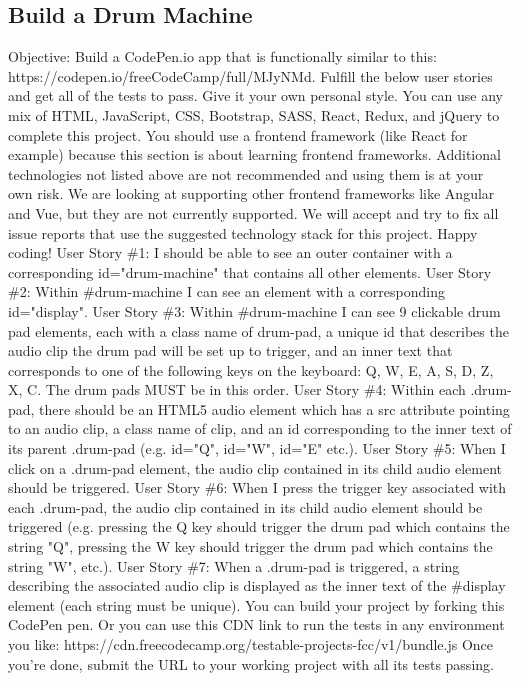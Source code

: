 \documentclass{article}%
\begin{document}
%
\subsection{Build a Drum Machine}%
\label{subsec:BuildaDrumMachine}%
Objective: Build a CodePen.io app that is functionally similar to this: https://codepen.io/freeCodeCamp/full/MJyNMd.\newline%
Fulfill the below user stories and get all of the tests to pass. Give it your own personal style.\newline%
You can use any mix of HTML, JavaScript, CSS, Bootstrap, SASS, React, Redux, and jQuery to complete this project. You should use a frontend framework (like React for example) because this section is about learning frontend frameworks. Additional technologies not listed above are not recommended and using them is at your own risk. We are looking at supporting other frontend frameworks like Angular and Vue, but they are not currently supported. We will accept and try to fix all issue reports that use the suggested technology stack for this project. Happy coding!\newline%
User Story \#1: I should be able to see an outer container with a corresponding id="drum{-}machine" that contains all other elements.\newline%
User Story \#2: Within \#drum{-}machine I can see an element with a corresponding id="display".\newline%
User Story \#3: Within \#drum{-}machine I can see 9 clickable drum pad elements, each with a class name of drum{-}pad, a unique id that describes the audio clip the drum pad will be set up to trigger, and an inner text that corresponds to one of the following keys on the keyboard: Q, W, E, A, S, D, Z, X, C. The drum pads MUST be in this order.\newline%
User Story \#4: Within each .drum{-}pad, there should be an HTML5 audio element which has a src attribute pointing to an audio clip, a class name of clip, and an id corresponding to the inner text of its parent .drum{-}pad (e.g. id="Q", id="W", id="E" etc.).\newline%
User Story \#5: When I click on a .drum{-}pad element, the audio clip contained in its child audio element should be triggered.\newline%
User Story \#6: When I press the trigger key associated with each .drum{-}pad, the audio clip contained in its child audio element should be triggered (e.g. pressing the Q key should trigger the drum pad which contains the string "Q", pressing the W key should trigger the drum pad which contains the string "W", etc.).\newline%
User Story \#7: When a .drum{-}pad is triggered, a string describing the associated audio clip is displayed as the inner text of the \#display element (each string must be unique).\newline%
You can build your project by forking this CodePen pen. Or you can use this CDN link to run the tests in any environment you like: https://cdn.freecodecamp.org/testable{-}projects{-}fcc/v1/bundle.js\newline%
Once you're done, submit the URL to your working project with all its tests passing.\newline%
\end{document}
